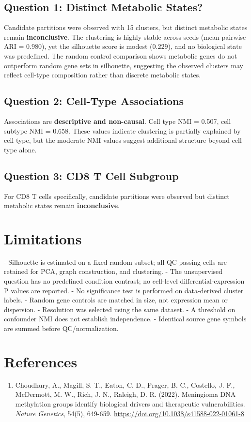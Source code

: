 \documentclass[11pt,a4paper]{article}
\begin{document}
\subsection{Question 1: Distinct Metabolic States?}
Candidate partitions were observed with 15 clusters, but distinct metabolic states remain \textbf{inconclusive}. The clustering is highly stable across seeds (mean pairwise ARI = 0.980), yet the silhouette score is modest (0.229), and no biological state was predefined. The random control comparison shows metabolic genes do not outperform random gene sets in silhouette, suggesting the observed clusters may reflect cell-type composition rather than discrete metabolic states.

\subsection{Question 2: Cell-Type Associations}
Associations are \textbf{descriptive and non-causal}. Cell type NMI = 0.507, cell subtype NMI = 0.658. These values indicate clustering is partially explained by cell type, but the moderate NMI values suggest additional structure beyond cell type alone.

\subsection{Question 3: CD8 T Cell Subgroup}
For CD8 T cells specifically, candidate partitions were observed but distinct metabolic states remain \textbf{inconclusive}.

\section{Limitations}
- Silhouette is estimated on a fixed random subset; all QC-passing cells are retained for PCA, graph construction, and clustering.
- The unsupervised question has no predefined condition contrast; no cell-level differential-expression P values are reported.
- No significance test is performed on data-derived cluster labels.
- Random gene controls are matched in size, not expression mean or dispersion.
- Resolution was selected using the same dataset.
- A threshold on confounder NMI does not establish independence.
- Identical source gene symbols are summed before QC/normalization.

\section{References}
\begin{enumerate}
\item Choudhury, A., Magill, S. T., Eaton, C. D., Prager, B. C., Costello, J. F., McDermott, M. W., Rich, J. N., Raleigh, D. R. (2022). Meningioma DNA methylation groups identify biological drivers and therapeutic vulnerabilities. \textit{Nature Genetics}, 54(5), 649-659. \url{https://doi.org/10.1038/s41588-022-01061-8}
\end{enumerate}
\end{document}
